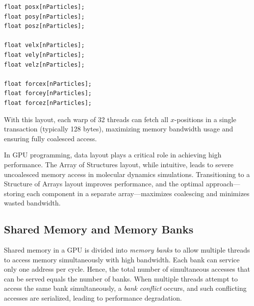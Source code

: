 \documentclass[12pt]{book}
\begin{document}
\begin{lstlisting}[style=cppstyle]
float posx[nParticles];
float posy[nParticles];
float posz[nParticles];

float velx[nParticles];
float vely[nParticles];
float velz[nParticles];

float forcex[nParticles];
float forcey[nParticles];
float forcez[nParticles];
\end{lstlisting}

With this layout, each warp of 32 threads can fetch all $x$-positions in a single transaction (typically 128 bytes), maximizing memory bandwidth usage and ensuring fully coalesced access.

In GPU programming, data layout plays a critical role in achieving high performance. The Array of Structures layout, while intuitive, leads to severe uncoalesced memory access in molecular dynamics simulations. Transitioning to a Structure of Arrays layout improves performance, and the optimal approach---storing each component in a separate array---maximizes coalescing and minimizes wasted bandwidth.

\subsection*{Shared Memory and Memory Banks}
Shared memory in a GPU is divided into \emph{memory banks} to allow multiple threads to access memory simultaneously with high bandwidth. Each bank can service only one address per cycle. Hence, the total number of simultaneous accesses that can be served equals the number of banks. When multiple threads attempt to access the same bank simultaneously, a \emph{bank conflict} occurs, and such conflicting accesses are serialized, leading to performance degradation.
\end{document}
